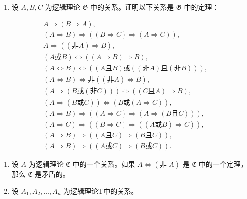 \exercisegroup

\begin{enumerate}
\def\labelenumi{\arabic{enumi}.}
\tightlist
\item
  设 \(A, B, C\) 为逻辑理论 \(\mathfrak{G}\) 中的关系。证明以下关系是 \(\mathfrak{G}\) 中的定理：
\end{enumerate}

\[
\begin{array}{c} A \Longrightarrow (B \Longrightarrow A), \\ (A \Longrightarrow B) \Longrightarrow ((B \Longrightarrow C) \Longrightarrow (A \Longrightarrow C)), \\ A \Longrightarrow ((\text {非} A) \Longrightarrow B), \\ (A \text {或} B) \Longleftrightarrow ((A \Longrightarrow B) \Longrightarrow B), \\ (A \Longleftrightarrow B) \Longleftrightarrow ((A \text {且} B) \text {或} ((\text {非} A) \text {且} (\text {非} B))), \\ (A \Longleftrightarrow B) \Longleftrightarrow \text {非} ((\text {非} A) \Longleftrightarrow B), \\ (A \Longrightarrow (B \text {或} (\text {非} C))) \Longleftrightarrow ((C \text {且} A) \Longrightarrow B), \\ (A \Longrightarrow (B \text {或} C)) \Longleftrightarrow (B \text {或} (A \Longrightarrow C)), \\ (A \Longrightarrow B) \Longrightarrow ((A \Longrightarrow C) \Longrightarrow (A \Longrightarrow (B \text {且} C))), \\ (A \Longrightarrow C) \Longrightarrow ((B \Longrightarrow C) \Longrightarrow ((A \text {或} B) \Longrightarrow C)), \\ (A \Longrightarrow B) \Longrightarrow ((A \text {且} C) \Longrightarrow (B \text {且} C)), \\ (A \Longrightarrow B) \Longrightarrow ((A \text {或} C) \Longrightarrow (B \text {或} C)). \end{array}
\]

\begin{enumerate}
\def\labelenumi{\arabic{enumi}.}
\setcounter{enumi}{1}
\item
  设 \(A\) 为逻辑理论 \(\mathfrak{C}\) 中的一个关系。如果 \(A \Longleftrightarrow (\text{非 } A)\) 是 \(\mathfrak{C}\) 中的一个定理，那么 \(\mathfrak{C}\) 是矛盾的。
\item
  设 \(A_{1}, A_{2}, \ldots, A_{n}\) 为逻辑理论T中的关系。
\end{enumerate}

